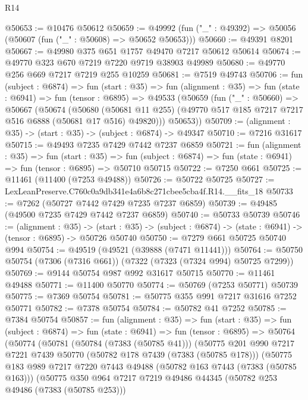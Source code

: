 \begin{lexlean}{R14}
\begin{coremodule}
@50653 := @10476 @50612
@50659 := @49992 (fun ("_" : @49392) => @50056 (@50607 (fun ("_" : @50608) => @50652 @50653)))
@50660 := @49391 @8201
@50667 := @49980 @375 @651 @1757 @49470 @7217 @50612 @50614
@50674 := @49770 @323 @670 @7219 @7220 @9719 @38903 @49989
@50680 := @49770 @256 @669 @7217 @7219 @255 @10259
@50681 := @7519 @49743
@50706 := fun (subject : @6874) =>
  fun (start : @35) =>
  fun (alignment : @35) =>
  fun (state : @6941) =>
  fun (tensor : @6895) =>
  @49533
    (@50659
      (fun ("_" : @50660) =>
      @50667
        (@50674
          (@50680
            (@50681 @11 @255)
            (@49770 @517 @185 @7217 @7217 @516 @6888 (@50681 @17 @516) @49820)))
        @50653))
@50709 := (alignment : @35) -> (start : @35) -> (subject : @6874) -> @49347
@50710 := @7216 @31617
@50715 := @49493 @7235 @7429 @7442 @7237 @6859
@50721 := fun (alignment : @35) =>
  fun (start : @35) =>
  fun (subject : @6874) => fun (state : @6941) => fun (tensor : @6895) => @50710 @50715
@50722 := @7250 @661
@50725 := @11461 (@11400 (@7253 @49488))
@50726 := @50722 @50725
@50727 := LexLeanPreserve.C760c0a9db341e4a6b8c271cbee5cba4f.R14.__fits_18
@50733 := @7262 (@50727 @7442 @7429 @7235 @7237 @6859)
@50739 := @49485 (@49500 @7235 @7429 @7442 @7237 @6859)
@50740 := @50733 @50739
@50746 := (alignment : @35) ->
  (start : @35) -> (subject : @6874) -> (state : @6941) -> (tensor : @6895) -> @50726 @50740
@50750 := @7279 @661 @50725 @50740 @994
@50754 := @49519 (@49521 (@39888 (@7471 @11441)))
@50764 := @50750 @50754 (@7306 (@7316 @661)) (@7322 (@7323 (@7324 @994) @50725 @7299))
@50769 := @9144 @50754 @987 @992 @31617 @50715
@50770 := @11461 @49488
@50771 := @11400 @50770
@50774 := @50769 (@7253 @50771) @50739
@50775 := @7369 @50754
@50781 := @50775 @355 @991 @7217 @31616 @7252 @50771
@50782 := @7378 @50754
@50784 := @50782 @41 @7252
@50785 := @7384 @50754
@50857 := fun (alignment : @35) =>
  fun (start : @35) =>
  fun (subject : @6874) =>
  fun (state : @6941) =>
  fun (tensor : @6895) =>
  @50764
    (@50774
      (@50781
        (@50784 (@7383 (@50785 @41)))
        (@50775
          @201
          @990
          @7217
          @7221
          @7439
          @50770
          (@50782 @178 @7439 (@7383 (@50785 @178)))
          (@50775
            @183
            @989
            @7217
            @7220
            @7443
            @49488
            (@50782 @163 @7443 (@7383 (@50785 @163)))
            (@50775
              @350
              @964
              @7217
              @7219
              @49486
              @44345
              (@50782 @253 @49486 (@7383 (@50785 @253)))

\end{coremodule}
\end{lexlean}
